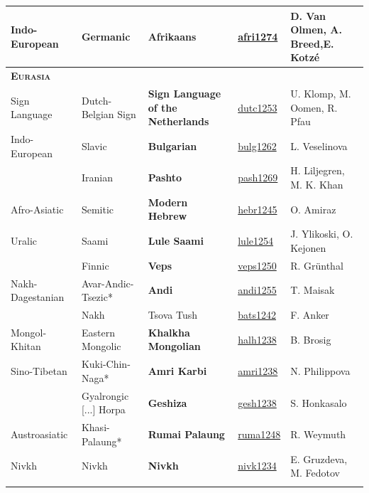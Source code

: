 \documentclass[output=paper,colorlinks,citecolor=brown]{langscibook}
\begin{document}
\begin{table}
\begin{tabularx}{\textwidth}{llp{30mm}lQ}
         Indo-European & Germanic &\bfseries  Afrikaans & \href{https://glottolog.org/resource/languoid/id/afri1274}{afri1274} & D. Van Olmen, A. Breed,\newline E. Kotzé\\
         \midrule
         \textsc{\textbf{Eurasia}} & & & &\\
         Sign Language & Dutch-Belgian Sign &\bfseries  Sign Language of the Netherlands & \href{https://glottolog.org/resource/languoid/id/dutc1253}{dutc1253} & U. Klomp, M. Oomen, R. Pfau\\
         Indo-European & Slavic &\bfseries  Bulgarian & \href{https://glottolog.org/resource/languoid/id/bulg1262}{bulg1262} & L. Veselinova\\
         & Iranian & \bfseries Pashto & \href{https://glottolog.org/resource/languoid/id/pash1269}{pash1269} & H. Liljegren, M. K. Khan\\
       
        Afro-Asiatic & Semitic & \bfseries Modern Hebrew & \href{https://glottolog.org/resource/languoid/id/hebr1245}{hebr1245} & O. Amiraz\\
         Uralic & Saami & \bfseries Lule Saami & \href{https://glottolog.org/resource/languoid/id/lule1254}{lule1254} & J. Ylikoski, O. Kejonen\\
         & Finnic & \bfseries Veps & \href{https://glottolog.org/resource/languoid/id/veps1250}{veps1250} & R. Grünthal\\
         Nakh-Dagestanian & Avar-Andic-Tsezic* & \bfseries Andi & \href{https://glottolog.org/resource/languoid/id/andi1255}{andi1255} & T. Maisak\\
         & Nakh & Tsova Tush & \href{https://glottolog.org/resource/languoid/id/bats1242}{bats1242} & F. Anker\\
        
         Mongol-Khitan & Eastern Mongolic & \bfseries Khalkha Mongolian & \href{https://glottolog.org/resource/languoid/id/halh1238}{halh1238} & B. Brosig\\
         
         Sino-Tibetan & Kuki-Chin-Naga* &\bfseries  Amri Karbi & \href{https://glottolog.org/resource/languoid/id/amri1238}{amri1238} & N. Philippova\\
         & Gyalrongic [...] Horpa & \bfseries Geshiza & \href{https://glottolog.org/resource/languoid/id/gesh1238}{gesh1238} & S. Honkasalo\\
         Austroasiatic & Khasi-Palaung* & \bfseries Rumai Palaung & \href{https://glottolog.org/resource/languoid/id/ruma1248}{ruma1248} & R. Weymuth\\
          Nivkh & Nivkh & \bfseries Nivkh & \href{https://glottolog.org/resource/languoid/id/nivk1234}{nivk1234} & E. Gruzdeva, M. Fedotov\\
         \lspbottomrule
    \end{tabularx}
 \end{table}
\end{document}
